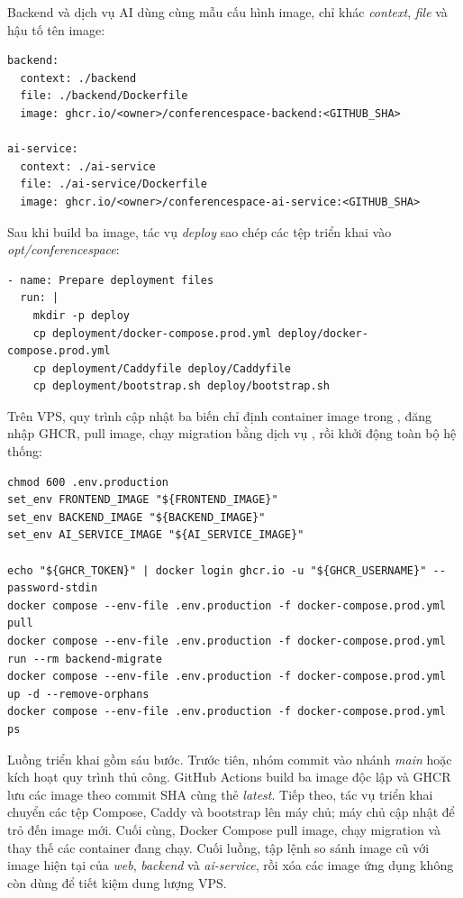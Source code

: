 Backend và dịch vụ AI dùng cùng mẫu cấu hình image, chỉ khác \textit{context}, \textit{file} và hậu tố tên image:

\begin{lstlisting}
backend:
  context: ./backend
  file: ./backend/Dockerfile
  image: ghcr.io/<owner>/conferencespace-backend:<GITHUB_SHA>

ai-service:
  context: ./ai-service
  file: ./ai-service/Dockerfile
  image: ghcr.io/<owner>/conferencespace-ai-service:<GITHUB_SHA>
\end{lstlisting}

Sau khi build ba image, tác vụ \textit{deploy} sao chép các tệp triển khai vào \textit{opt/conferencespace}:

\begin{lstlisting}
- name: Prepare deployment files
  run: |
    mkdir -p deploy
    cp deployment/docker-compose.prod.yml deploy/docker-compose.prod.yml
    cp deployment/Caddyfile deploy/Caddyfile
    cp deployment/bootstrap.sh deploy/bootstrap.sh
\end{lstlisting}

Trên VPS, quy trình cập nhật ba biến chỉ định container image trong , đăng nhập GHCR, pull image, chạy migration bằng dịch vụ , rồi khởi động toàn bộ hệ thống:

\begin{lstlisting}
chmod 600 .env.production
set_env FRONTEND_IMAGE "${FRONTEND_IMAGE}"
set_env BACKEND_IMAGE "${BACKEND_IMAGE}"
set_env AI_SERVICE_IMAGE "${AI_SERVICE_IMAGE}"

echo "${GHCR_TOKEN}" | docker login ghcr.io -u "${GHCR_USERNAME}" --password-stdin
docker compose --env-file .env.production -f docker-compose.prod.yml pull
docker compose --env-file .env.production -f docker-compose.prod.yml run --rm backend-migrate
docker compose --env-file .env.production -f docker-compose.prod.yml up -d --remove-orphans
docker compose --env-file .env.production -f docker-compose.prod.yml ps
\end{lstlisting}

Luồng triển khai gồm sáu bước. Trước tiên, nhóm commit vào nhánh \textit{main} hoặc kích hoạt quy trình thủ công. GitHub Actions build ba image độc lập và GHCR lưu các image theo commit SHA cùng thẻ \textit{latest}. Tiếp theo, tác vụ triển khai chuyển các tệp Compose, Caddy và bootstrap lên máy chủ; máy chủ cập nhật  để trỏ đến image mới. Cuối cùng, Docker Compose pull image, chạy migration và thay thế các container đang chạy. Cuối luồng, tập lệnh so sánh image cũ với image hiện tại của \textit{web}, \textit{backend} và \textit{ai-service}, rồi xóa các image ứng dụng không còn dùng để tiết kiệm dung lượng VPS.

